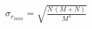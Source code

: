 


\begin{eqnarray*}
  \sigma_{r_{mon}} = \sqrt{\frac{N\,\left( M + N \right) }{M^3}}
\end{eqnarray*}

